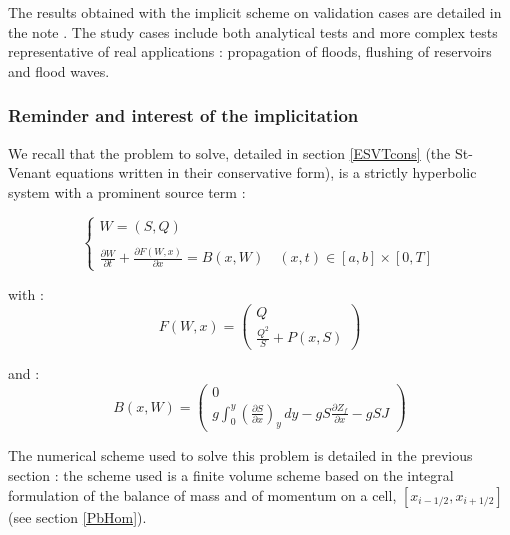 The results obtained with the implicit scheme on validation cases are detailed in the note \cite{GOUTAL02}. The study cases include both analytical tests and more complex tests representative of real applications : propagation of floods, flushing of reservoirs and flood waves.

\subsubsection{Reminder and interest of the implicitation}

We recall that the problem to solve, detailed in section \ref{ESVTcons} (the St-Venant equations written in their conservative form), is a strictly hyperbolic system with a prominent source term :

\begin{equation}
  \label{PbP}
   \left \lbrace
  \begin{array}{l}
   W = (S,Q) \\
  \\
   \frac{\partial W}{\partial t} + \frac{\partial F(W,x)}{\partial x} = B(x,W) \quad (x,t) \in [a,b] \times [0,T]
\end{array}
 \right.
\end{equation}

with :
\begin{equation}
 F(W,x) = \left ( \begin{array}{c}
       Q \\
       \frac{Q^2}{S} + P(x,S)
    \end{array} \right )
\end{equation}

and :
\begin{equation}
 B(x,W) = \left ( \begin{array}{c}
       0 \\
       g \int_{0}^y \left ( \frac{\partial S}{\partial x} \right )_y \, dy - g S \frac{\partial Z_f}{\partial x} - g S J
    \end{array} \right )
\end{equation}

The numerical scheme used to solve this problem is detailed in the previous section : the scheme used is a finite volume scheme based on the integral formulation of the balance of mass and of momentum on a cell, $[x_{i-1/2}, x_{i+1/2}]$ (see section \ref{PbHom}).

